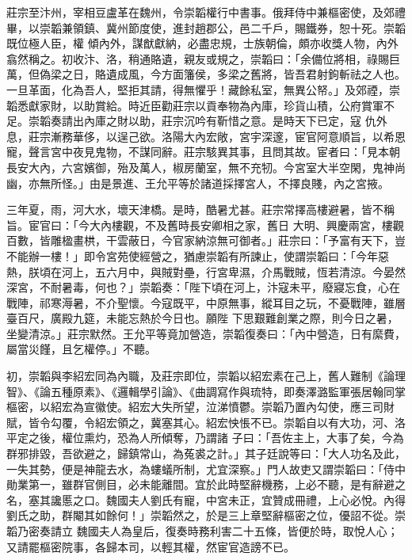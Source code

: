 \begin{pinyinscope}
 莊宗至汴州，宰相豆盧革在魏州，令崇韜權行中書事。俄拜侍中兼樞密使，及郊禮畢，以崇韜兼領鎮、冀州節度使，進封趙郡公，邑二千戶，賜鐵券，恕十死。崇韜既位極人臣，權
 傾內外，謀猷獻納，必盡忠規，士族朝倫，頗亦收獎人物，內外翕然稱之。初收汴、洛，稍通賂遺，親友或規之，崇韜曰：「余備位將相，祿賜巨萬，但偽梁之日，賂遺成風，今方面籓侯，多梁之舊將，皆吾君射鉤斬祛之人也。一旦革面，化為吾人，堅拒其請，得無懼乎！藏餘私室，無異公帑。」及郊禋，崇韜悉獻家財，以助賞給。時近臣勸莊宗以貢奉物為內庫，珍貨山積，公府賞軍不足。崇韜奏請出內庫之財以助，莊宗沉吟有靳惜之意。是時天下已定，寇
 仇外息，莊宗漸務華侈，以逞己欲。洛陽大內宏敞，宮宇深邃，宦官阿意順旨，以希恩寵，聲言宮中夜見鬼物，不謀同辭。莊宗駭異其事，且問其故。宦者曰：「見本朝長安大內，六宮嬪御，殆及萬人，椒房蘭室，無不充牣。今宮室大半空閑，鬼神尚幽，亦無所怪。」由是景進、王允平等於諸道採擇宮人，不擇良賤，內之宮掖。



 三年夏，雨，河大水，壞天津橋。是時，酷暑尤甚。莊宗常擇高樓避暑，皆不稱旨。宦官曰：「今大內樓觀，不及舊時長安卿相之家，舊日
 大明、興慶兩宮，樓觀百數，皆雕楹畫栱，干雲蔽日，今官家納涼無可御者。」莊宗曰：「予富有天下，豈不能辦一樓！」即令宮苑使經營之，猶慮崇韜有所諫止，使謂崇韜曰：「今年惡熱，朕頃在河上，五六月中，與賊對壘，行宮卑濕，介馬戰賊，恆若清涼。今晏然深宮，不耐暑毒，何也？」崇韜奏：「陛下頃在河上，汴寇未平，廢寢忘食，心在戰陣，祁寒溽暑，不介聖懷。今寇既平，中原無事，縱耳目之玩，不憂戰陣，雖層臺百尺，廣殿九筵，未能忘熱於今日也。願陛
 下思艱難創業之際，則今日之暑，坐變清涼。」莊宗默然。王允平等竟加營造，崇韜復奏曰：「內中營造，日有縻費，屬當災饉，且乞權停。」不聽。



 初，崇韜與李紹宏同為內職，及莊宗即位，崇韜以紹宏素在己上，舊人難制《論理智》、《論五種原素》、《邏輯學引論》、《曲調寫作與琉特，即奏澤潞監軍張居翰同掌樞密，以紹宏為宣徽使。紹宏大失所望，泣涕憤鬱。崇韜乃置內勾使，應三司財賦，皆令勾覆，令紹宏領之，冀塞其心。紹宏怏悵不已。崇韜自以有大功，河、洛平定之後，權位熏灼，恐為人所傾奪，乃謂諸
 子曰：「吾佐主上，大事了矣，今為群邪排毀，吾欲避之，歸鎮常山，為菟裘之計。」其子廷說等曰：「大人功名及此，一失其勢，便是神龍去水，為螻蟻所制，尤宜深察。」門人故吏又謂崇韜曰：「侍中勛業第一，雖群官側目，必未能離間。宜於此時堅辭機務，上必不聽，是有辭避之名，塞其讒慝之口。魏國夫人劉氏有寵，中宮未正，宜贊成冊禮，上心必悅。內得劉氏之助，群閹其如餘何！」崇韜然之，於是三上章堅辭樞密之位，優詔不從。崇韜乃密奏請立
 魏國夫人為皇后，復奏時務利害二十五條，皆便於時，取悅人心；又請罷樞密院事，各歸本司，以輕其權，然宦官造謗不已。




\end{pinyinscope}

